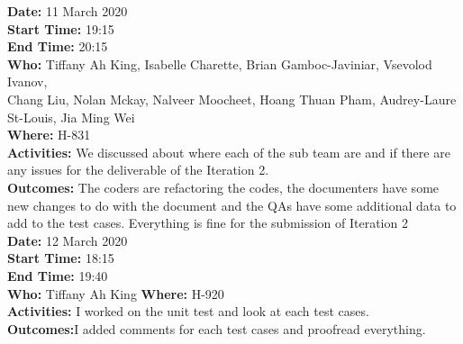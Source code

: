 \documentclass[12pt]{article}
\begin{document}
{\bf Date:} 11 March 2020\\
{\bf Start Time:} 19:15\\
{\bf End Time:} 20:15 \\
{\bf Who:} Tiffany Ah King, Isabelle Charette, Brian Gamboc-Javiniar, Vsevolod Ivanov,\\
Chang Liu, Nolan Mckay, Nalveer Moocheet, Hoang Thuan Pham, Audrey-Laure St-Louis, Jia Ming Wei\\
{\bf Where:} H-831\\
{\bf Activities:} We discussed about where each of the sub team are and if there are any issues for the deliverable of the Iteration 2.\\
{\bf Outcomes:} The coders are refactoring the codes, the documenters have some new changes to do with the document and the QAs have some additional data to add to the test cases. Everything is fine for the submission of Iteration 2\\

{\bf Date:} 12 March 2020\\
{\bf Start Time:} 18:15 \\
{\bf End Time:} 19:40\\
{\bf Who:} Tiffany Ah King
{\bf Where:} H-920\\
{\bf Activities:} I worked on the unit test and look at each test cases. \\
{\bf Outcomes:}I added comments for each test cases and proofread everything.\\

\end{document}
